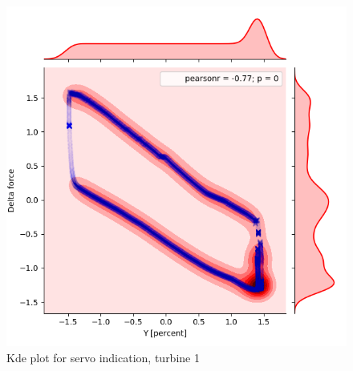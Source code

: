 \begin{figure}
    \begin{minipage}[b]{0.5\linewidth}
        \centering
        \includegraphics[width=1\linewidth]{figures/data/kdePlot_servoindication_A1.png}
        \caption{Kde plot for servo indication, turbine 1}
    \end{minipage}

\end{figure}




